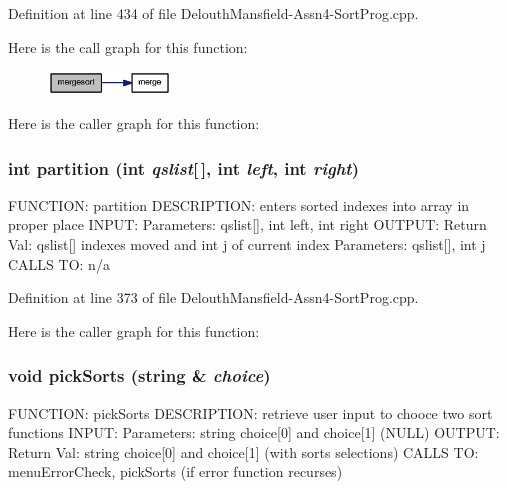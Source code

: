 Definition at line 434 of file DelouthMansfield-\/Assn4-\/SortProg.cpp.



Here is the call graph for this function:\nopagebreak
\begin{figure}[H]
\begin{center}
\leavevmode
\includegraphics[width=92pt]{_delouth_mansfield-_assn4-_sort_prog_8cpp_a5f5d9f539f726c766f4c454c579f2f6d_cgraph}
\end{center}
\end{figure}




Here is the caller graph for this function:

\hypertarget{_delouth_mansfield-_assn4-_sort_prog_8cpp_af199bb360825bf6dbcb98371c70419e1}{
\subsubsection[{partition}]{\setlength{\rightskip}{0pt plus 5cm}int partition (int {\em qslist}\mbox{[}$\,$\mbox{]}, \/  int {\em left}, \/  int {\em right})}}
\label{_delouth_mansfield-_assn4-_sort_prog_8cpp_af199bb360825bf6dbcb98371c70419e1}
FUNCTION: partition DESCRIPTION: enters sorted indexes into array in proper place INPUT: Parameters: qslist\mbox{[}\mbox{]}, int left, int right OUTPUT: Return Val: qslist\mbox{[}\mbox{]} indexes moved and int j of current index Parameters: qslist\mbox{[}\mbox{]}, int j CALLS TO: n/a 

Definition at line 373 of file DelouthMansfield-\/Assn4-\/SortProg.cpp.



Here is the caller graph for this function:

\hypertarget{_delouth_mansfield-_assn4-_sort_prog_8cpp_a401a41ad70746c8dd39ecc19286b5e38}{
\subsubsection[{pickSorts}]{\setlength{\rightskip}{0pt plus 5cm}void pickSorts (string \& {\em choice})}}
\label{_delouth_mansfield-_assn4-_sort_prog_8cpp_a401a41ad70746c8dd39ecc19286b5e38}
FUNCTION: pickSorts DESCRIPTION: retrieve user input to chooce two sort functions INPUT: Parameters: string choice\mbox{[}0\mbox{]} and choice\mbox{[}1\mbox{]} (NULL) OUTPUT: Return Val: string choice\mbox{[}0\mbox{]} and choice\mbox{[}1\mbox{]} (with sorts selections) CALLS TO: menuErrorCheck, pickSorts (if error function recurses) 

